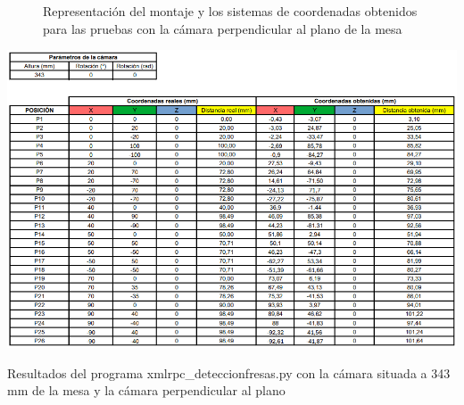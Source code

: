    \begin{figure}[H]
      \begin{center}
        \subcapcentertrue
        \hspace{1mm}
      \end{center}
      \caption{Representación del montaje y los sistemas de coordenadas obtenidos para las pruebas con la cámara perpendicular al plano de la mesa}
      \label{fig:deteccion_plano_perpendicular}
    \end{figure}
   
    
    \begin{table}[H]
     \centering
     \begin{center}
       \includegraphics[width=155mm]{figs/Resultados 343 mm 0 grados.png}
     \end{center}
     \caption{Resultados del programa xmlrpc\_deteccionfresas.py con la cámara situada a 343 mm de la mesa y la cámara perpendicular al plano}
     \label{tab:resultados_343mm_0grados}
  \end{table}


